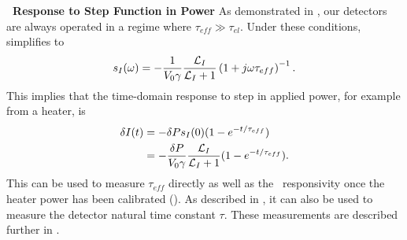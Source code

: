 \textbf{\TES\ Response to Step Function in Power}
As demonstrated in , our detectors are always operated in a regime where $\tau_{eff} \gg \tau_{el}$.
Under these conditions,  simplifies to
\begin{equation} \label{eqn:htr-step-resp-high}
s_I(\omega) = - \frac{1}{V_0 \gamma}\frac{\mathcal{L}_I}{\mathcal{L}_I + 1}
                       \left(1 + j \omega \tau_{eff}\right)^{-1}.
\end{equation}
This implies that the time-domain response to step in applied power, for example from a heater, is
\begin{align} \label{eqn:htr-step-resp-high-time}
    \delta I(t) & = - \delta P s_I(0) (1 - e^{-t/\tau_{eff}}) \\
                & = - \frac{\delta P}{V_0 \gamma}\frac{\mathcal{L}_I}{\mathcal{L}_I + 1}
                      (1 - e^{-t/\tau_{eff}}).
\end{align}
This can be used to measure $\tau_{eff}$ directly as well as the \DC\ responsivity once the heater power has been calibrated ().
As described in , it can also be used to measure the detector natural time constant $\tau$.
These measurements are described further in .

